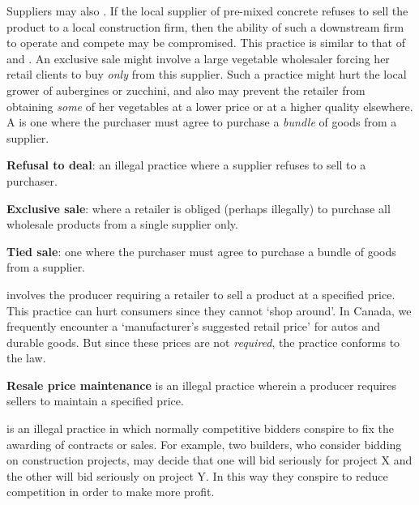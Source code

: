 \newhtmlpage

Suppliers may also . If the local supplier of
pre-mixed concrete refuses to sell the product to a local construction firm,
then the ability of such a downstream firm to operate and compete may be
compromised. This practice is similar to that of  and . An exclusive sale might involve a large
vegetable wholesaler forcing her retail clients to buy \textit{only} from
this supplier. Such a practice might hurt the local grower of aubergines or
zucchini, and also may prevent the retailer from obtaining \textit{some} of
her vegetables at a lower price or at a higher quality elsewhere. A  is one where the purchaser must agree to purchase a \textit{bundle} of
goods from a supplier.

\begin{DefBox}
	\textbf{Refusal to deal}: an illegal practice where a supplier refuses to sell to a purchaser.
	
	\textbf{Exclusive sale}: where a retailer is obliged (perhaps illegally) to purchase all wholesale products from a single supplier only.
	
	\textbf{Tied sale}: one where the purchaser must agree to purchase a bundle of goods from a supplier.
\end{DefBox}

 involves the producer requiring a
retailer to sell a product at a specified price. This practice can hurt
consumers since they cannot `shop around'. In Canada, we frequently
encounter a `manufacturer's suggested retail price' for autos and durable
goods. But since these prices are not \textit{required}, the practice
conforms to the law.

\begin{DefBox}
	\textbf{Resale price maintenance} is an illegal practice wherein a producer requires sellers to maintain a specified price.
\end{DefBox}

\newhtmlpage

 is an illegal practice in which normally
competitive bidders conspire to fix the awarding of contracts or sales. For
example, two builders, who consider bidding on construction projects, may
decide that one will bid seriously for project X and the other will bid
seriously on project Y. In this way they conspire to reduce competition in
order to make more profit.

